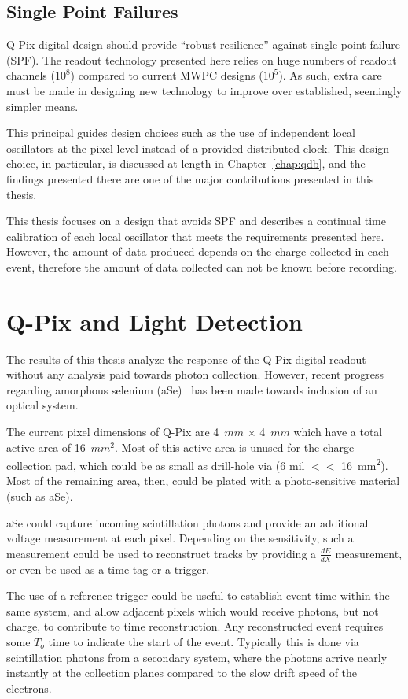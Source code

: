 \subsection{Single Point Failures}
Q-Pix digital design should provide ``robust resilience'' against single point failure (SPF).
The readout technology presented here relies on huge numbers of readout channels ($10^{8}$) compared to current MWPC designs ($10^{5}$).
As such, extra care must be made in designing new technology to improve over established, seemingly simpler means.

This principal guides design choices such as the use of independent local oscillators at the pixel-level instead of a provided distributed clock.
This design choice, in particular, is discussed at length in Chapter~\ref{chap:qdb}, and the findings presented there are one of the major contributions presented in this thesis.

This thesis focuses on a design that avoids SPF and describes a continual time calibration of each local oscillator that meets the requirements presented here.
However, the amount of data produced depends on the charge collected in each event, therefore the amount of data collected can not be known before recording.

\section{Q-Pix and Light Detection}
\label{sec:qpix_photonics}
The results of this thesis analyze the response of the Q-Pix digital readout without any analysis paid towards photon collection.
However, recent progress regarding amorphous selenium (aSe)~\citep{https://doi.org/10.48550/arxiv.2207.11127} has been made towards inclusion of an optical system.

The current pixel dimensions of Q-Pix are 4~$\unit{mm}$ $\times$ 4~$\unit{mm} $ which have a total active area of 16~$\unit{mm^{2}}$.
Most of this active area is unused for the charge collection pad, which could be as small as drill-hole via (6 mil $<<$ 16~\unit{mm^2}).
Most of the remaining area, then, could be plated with a photo-sensitive material (such as aSe).

aSe could capture incoming scintillation photons and provide an additional voltage measurement at each pixel.
Depending on the sensitivity, such a measurement could be used to reconstruct tracks by providing a $\frac{dE}{dX}$ measurement, or even be used as a time-tag or a trigger.

The use of a reference trigger could be useful to establish event-time within the same system, and allow adjacent pixels which would receive photons, but not charge, to contribute to time reconstruction.
Any reconstructed event requires some $T_{o}$ time to indicate the start of the event.
Typically this is done via scintillation photons from a secondary system, where the photons arrive nearly instantly at the collection planes compared to the slow drift speed of the electrons.

